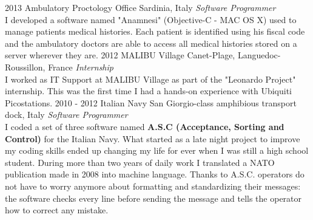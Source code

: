 \documentclass[]{friggeri-cv} %
\begin{document}
\begin{entrylist}
\entry
{2013}
{Ambulatory Proctology Office}
{Sardinia, Italy}
{\emph{Software Programmer} \\
I developed a software named "Anamnesi" (Objective-C - MAC OS X) used to manage patients medical histories. Each patient is identified using his fiscal code and the ambulatory doctors are able to access all medical histories stored on a server wherever they are.}
\entry
{2012}
{MALIBU Village}
{Canet-Plage, Languedoc-Roussillon, France}
{\emph{Internship} \\
I worked as IT Support at MALIBU Village as part of the "Leonardo Project" internship. This was the first time I had a hands-on experience with Ubiquiti Picostations.}
\entry
{2010 - 2012}
{Italian Navy}
{San Giorgio-class amphibious transport dock, Italy}
{\emph{Software Programmer} \\
I coded a set of three software named \textbf{A.S.C (Acceptance, Sorting and Control)} for the Italian Navy. What started as a late night project to improve my coding skills ended up changing my life for ever when I was still a high school student. During more than two years of daily work I translated a NATO publication made in 2008 into machine language. Thanks to A.S.C. operators do not have to worry anymore about formatting and standardizing their messages: the software checks every line before sending the message and tells the operator how to correct any mistake.}
\end{entrylist}

\newpage

\end{document}
